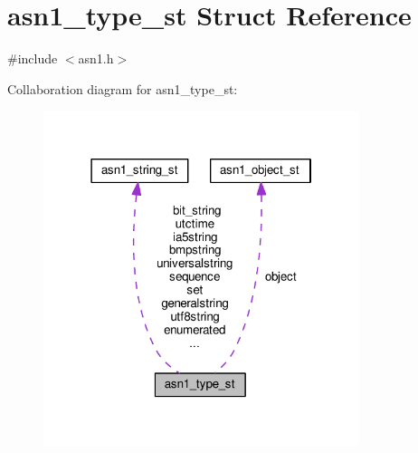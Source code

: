 \hypertarget{structasn1__type__st}{}\section{asn1\+\_\+type\+\_\+st Struct Reference}
\label{structasn1__type__st}


{\ttfamily \#include $<$asn1.\+h$>$}



Collaboration diagram for asn1\+\_\+type\+\_\+st\+:
\nopagebreak
\begin{figure}[H]
\begin{center}
\leavevmode
\includegraphics[width=262pt]{structasn1__type__st__coll__graph}
\end{center}
\end{figure}
